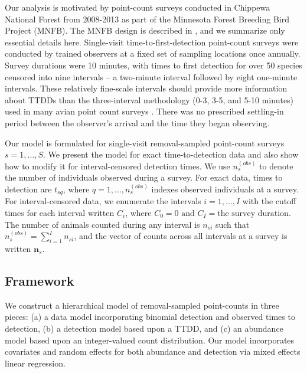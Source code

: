 \documentclass[useAMS,usenatbib,referee,12pt]{article}
\newcommand{\vn}{\textbf{n}}
\begin{document}
Our analysis is motivated by point-count surveys conducted in Chippewa National Forest from 2008-2013 as part of the Minnesota Forest Breeding Bird Project (MNFB).  
The MNFB design is described in \citet{Hanowski1995}, and we summarize only essential details here.  
Single-visit time-to-first-detection point-count surveys were conducted by trained observers at a fixed set of sampling locations once annually.  
Survey durations were 10 minutes, with times to first detection for over 50 species censored into nine intervals -- a two-minute interval followed by eight one-minute intervals.  
These relatively fine-scale intervals should provide more information about TTDDs than the three-interval methodology (0-3, 3-5, and 5-10 minutes) used in many avian point count surveys \citep{Ralph1995}.
There was no prescribed settling-in period between the observer's arrival and the time they began observing.  

Our model is formulated for single-visit removal-sampled point-count surveys $s=1,\dotso,S$.  
We present the model for exact time-to-detection data and also show how to modify it for interval-censored detection times.  
We use $n_{s}^{(obs)}$ to denote the number of individuals observed during a survey.  
For exact data, times to detection are $t_{sq}$, where $q = 1,\dotso,n_{s}^{(obs)}$ indexes observed individuals at a survey.  
For interval-censored data, we enumerate the intervals $i = 1,\dotso,I$ with the cutoff times for each interval written $C_i$, where $C_0 = 0 \text{ and } C_I = \text{the survey duration}$.  
The number of animals counted during any interval is $n_{si}$ such that $n_{s}^{(obs)} = \sum_{i=1}^I n_{si}$, and the vector of counts across all intervals at a survey is written $\vn_{s}$.

\subsection{Framework}

We construct a hierarchical model of removal-sampled point-counts in three pieces: (a) a data model incorporating binomial detection and observed times to detection, (b) a detection model based upon a TTDD, and (c) an abundance model based upon an integer-valued count distribution.  
Our model incorporates covariates and random effects for both abundance and detection via mixed effects linear regression.
\end{document}
